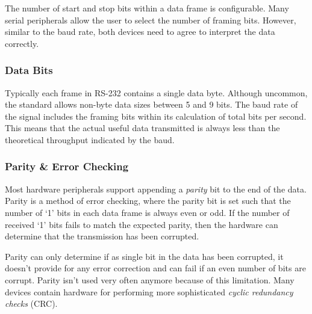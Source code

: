 \documentclass[11pt,fleqn]{book} %
\begin{document}
The number of start and stop bits within a data frame is configurable. Many serial peripherals allow the user to select the number of framing bits. However, similar to the baud rate, both devices need to agree to interpret the data correctly. 

\subsubsection{Data Bits} 
Typically each frame in RS-232 contains a single data byte. Although uncommon, the standard allows non-byte data sizes between 5 and 9 bits. The baud rate of the signal includes the framing bits within its calculation of total bits per second. This means that the actual useful data transmitted is always less than the theoretical throughput indicated by the baud. 

\subsubsection{Parity \& Error Checking}
Most hardware peripherals support appending a \textit{parity} bit to the end of the data. Parity is a method of error checking, where the parity bit is set such that the number of `1' bits in each data frame is always even or odd. If the number of received `1' bits fails to match the expected parity, then the hardware can determine that the transmission has been corrupted. 

Parity can only determine if as single bit in the data has been corrupted, it doesn't provide for any error correction and can fail if an even number of bits are corrupt. Parity isn't used very often anymore because of this limitation. Many devices contain hardware for performing more sophisticated \textit{cyclic redundancy checks} (CRC).  

%
\end{document}
